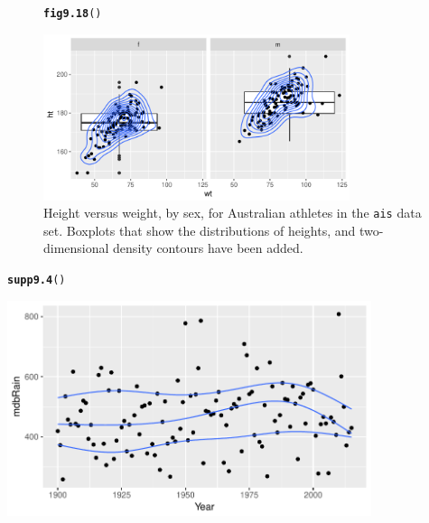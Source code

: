 \documentclass[12pt, a4paper,  BCOR=8.25mm, DIV=15]{scrartcl}\usepackage[]{graphicx}\usepackage[]{color}
\makeatletter
\newcommand{\hlstd}[1]{\textcolor[rgb]{0.345,0.345,0.345}{#1}}%
\newcommand{\hlkwd}[1]{\textcolor[rgb]{0.737,0.353,0.396}{\textbf{#1}}}%
\newenvironment{kframe}{%
 \def\at@end@of@kframe{}%
 \ifinner\ifhmode%
  \def\at@end@of@kframe{\end{minipage}}%
  \begin{minipage}{\columnwidth}%
 \fi\fi%
 \def\FrameCommand##1{\hskip\@totalleftmargin \hskip-\fboxsep
 \colorbox{shadecolor}{##1}\hskip-\fboxsep
     \hskip-\linewidth \hskip-\@totalleftmargin \hskip\columnwidth}%
 \MakeFramed {\advance\hsize-\width
   \@totalleftmargin\z@ \linewidth\hsize
   \@setminipage}}%
 {\par\unskip\endMakeFramed%
 \at@end@of@kframe}
\newenvironment{knitrout}{}{} %
\makeatother
\begin{document}
\begin{figure}[ht]
\begin{knitrout}
\color{fgcolor}\begin{kframe}
\begin{alltt}
\hlkwd{fig9.18}\hlstd{()}
\end{alltt}
\end{kframe}

{\centering \includegraphics[width=0.8\textwidth]{figs/gph-fig9_18e-1} 

}



\end{knitrout}
\caption{Height versus weight, by sex, for Australian athletes in the
\texttt{ais} data set. Boxplots that show the distributions of heights,
and two-dimensional density contours have been
added.\label{fig:ggais}}

\end{figure}

\begin{suppfigure}
\begin{knitrout}
\color{fgcolor}\begin{kframe}
\begin{alltt}
\hlkwd{supp9.4}\hlstd{()}
\end{alltt}
\end{kframe}

{\centering \includegraphics[width=0.8\textwidth]{figs/gph-supp9_4e-1} 

}



\end{knitrout}
\caption{Annual rainfall, from 1901 to 2012, for the Murray-Darling
  basin region of Australia.  Curves that estimate the 20\%, 50\% and 80\%
  quantiles have been fitted.\label{fig:ggrainpc}}
\end{suppfigure}
\end{document}
